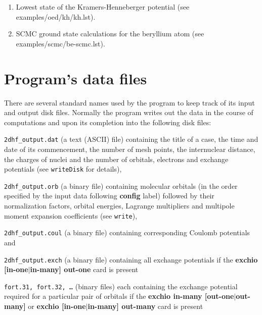 \documentclass[12pt,a4paper]{article}
\begin{document}
\begin{enumerate}





\newpage

\item Lowest state of the Kramers-Henneberger potential (see
  examples/\-oed/\-kh/\-kh.lst).



\item SCMC ground state calculations for the beryllium atom (see
  examples/\-scmc/\-be-scmc.lst).



\end{enumerate}

\newpage

\section{Program's data files}

There are several standard names used by the program to keep track of its input and output
disk files. Normally the program writes out the data in the course of computations and
upon its completion into the following disk files:
\begin{description}

\item \texttt{2dhf\_output.dat} (a text (ASCII) file) containing the title of a case, the
  time and date of its commencement, the number of mesh points, the internuclear distance,
  the charges of nuclei and the number of orbitals, electrons and exchange potentials (see
  \texttt{writeDisk} for details),

\item \texttt{2dhf\_output.orb} (a binary file) containing molecular orbitals (in the
  order specified by the input data following \textbf{config} label) followed by their
  normalization factors, orbital energies, Lagrange multipliers and multipole moment
  expansion coefficients (see \texttt{write\*}),

\item \texttt{2dhf\_output.coul} (a binary file) containing
  corresponding Coulomb potentials and

\item \texttt{2dhf\_output.exch} (a binary file) containing all exchange potentials if the
  \textbf{exchio [in-one$|$in-many] out-one} card is present

\item \texttt{fort.31, fort.32, \ldots} (binary files) each containing the exchange
  potential required for a particular pair of orbitals if the \textbf{exchio in-many
    [out-one$|$out-many]} or \textbf{exchio [in-one$|$in-many] out-many} card is present
\end{description}
\end{document}
